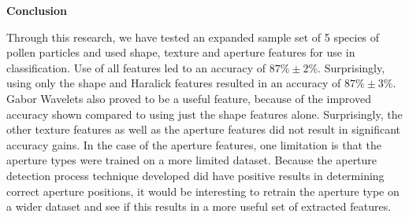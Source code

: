 \textbf{Conclusion}

Through this research, we have tested an expanded sample set of 5 species of pollen particles and used shape, texture and aperture features for use in classification. Use of all features led to an accuracy of $87\% \pm 2\%$. Surprisingly, using only the shape and Haralick features resulted in an accuracy of $87\% \pm 3\%$. Gabor Wavelets also proved to be a useful feature, because of the improved accuracy shown compared to using just the shape features alone. Surprisingly, the other texture features as well as the aperture features did not result in significant accuracy gains. In the case of the aperture features, one limitation is that the aperture types were trained on a more limited dataset. Because the aperture detection process technique developed did have positive results in determining correct aperture positions, it would be interesting to retrain the aperture type on a wider dataset and see if this results in a more useful set of extracted features. 
    
  